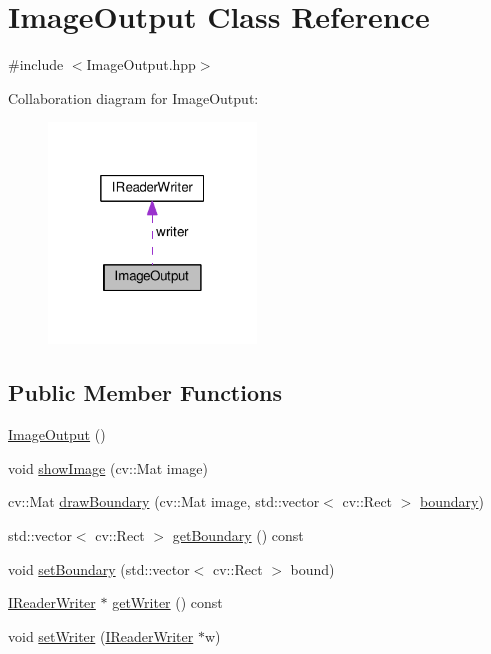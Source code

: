 \hypertarget{classImageOutput}{}\section{Image\+Output Class Reference}
\label{classImageOutput}


{\ttfamily \#include $<$Image\+Output.\+hpp$>$}



Collaboration diagram for Image\+Output\+:
\nopagebreak
\begin{figure}[H]
\begin{center}
\leavevmode
\includegraphics[width=157pt]{classImageOutput__coll__graph}
\end{center}
\end{figure}
\subsection*{Public Member Functions}
\begin{DoxyCompactItemize}
\item 
\hyperlink{classImageOutput_acd191c0743501f00240fa87080db187d}{Image\+Output} ()
\item 
void \hyperlink{classImageOutput_a366b4b4dc1a3d42b4c6dd2601a5668c6}{show\+Image} (cv\+::\+Mat image)
\item 
cv\+::\+Mat \hyperlink{classImageOutput_af2d882c564dc495b263a9c7dfdde2671}{draw\+Boundary} (cv\+::\+Mat image, std\+::vector$<$ cv\+::\+Rect $>$ \hyperlink{classImageOutput_acf9d0f7617433a905fcd5deeed24ed65}{boundary})
\item 
std\+::vector$<$ cv\+::\+Rect $>$ \hyperlink{classImageOutput_a9bd38d9812c4c70fd646ce569d183469}{get\+Boundary} () const 
\item 
void \hyperlink{classImageOutput_a79f7ae3fb3091629232f9b04a3b3232e}{set\+Boundary} (std\+::vector$<$ cv\+::\+Rect $>$ bound)
\item 
\hyperlink{classIReaderWriter}{I\+Reader\+Writer} $\ast$ \hyperlink{classImageOutput_a7d673d591761131af199d8284c7ebbe5}{get\+Writer} () const 
\item 
void \hyperlink{classImageOutput_abd982398c9a8ce648119f3088964014f}{set\+Writer} (\hyperlink{classIReaderWriter}{I\+Reader\+Writer} $\ast$w)
\end{DoxyCompactItemize}
